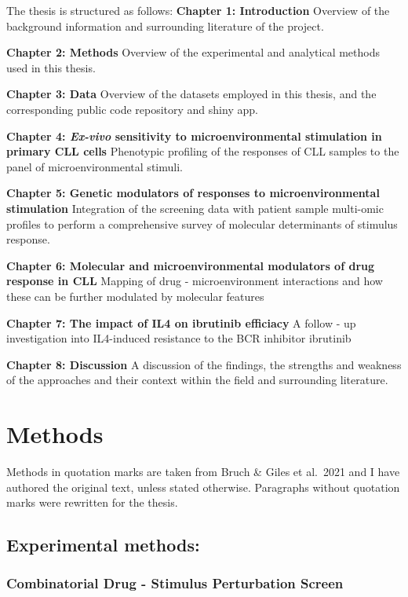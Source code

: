\documentclass[11pt, a4paper, twosided]{book}
\begin{document}
The thesis is structured as follows:
\textbf{Chapter 1: Introduction} Overview of the background information and surrounding literature of the project.

\textbf{Chapter 2: Methods} Overview of the experimental and analytical methods used in this thesis.

\textbf{Chapter 3: Data} Overview of the datasets employed in this thesis, and the corresponding public code repository and shiny app.

\textbf{Chapter 4: \emph{Ex-vivo} sensitivity to microenvironmental stimulation in primary CLL cells }
Phenotypic profiling of the responses of CLL samples to the panel of microenvironmental stimuli.

\textbf{Chapter 5: Genetic modulators of responses to microenvironmental stimulation} Integration of the screening data with patient sample multi-omic profiles to perform a comprehensive survey of molecular determinants of stimulus response.

\textbf{Chapter 6: Molecular and microenvironmental modulators of drug response in CLL} Mapping of drug - microenvironment interactions and how these can be further modulated by molecular features

\textbf{Chapter 7: The impact of IL4 on ibrutinib efficiacy } A follow - up investigation into IL4-induced resistance to the BCR inhibitor ibrutinib

\textbf{Chapter 8: Discussion } A discussion of the findings, the strengths and weakness of the approaches and their context within the field and surrounding literature.

\hypertarget{methods}{%
\chapter{Methods}\label{methods}}

Methods in quotation marks are taken from Bruch \& Giles et al.~2021 and I have authored the original text, unless stated otherwise. Paragraphs without quotation marks were rewritten for the thesis.

\hypertarget{experimental-methods}{%
\section{Experimental methods:}\label{experimental-methods}}

\hypertarget{combinatorial-drug---stimulus-perturbation-screen}{%
\subsection{Combinatorial Drug - Stimulus Perturbation Screen}\label{combinatorial-drug---stimulus-perturbation-screen}}
\end{document}
